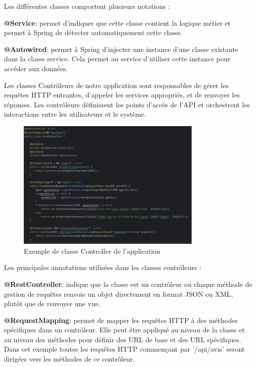         Les différentes classes comportent plusieurs notations :
        \medskip

        \textbf{@Service}: permet d'indiquer que cette classe contient la logique métier et permet à Spring de détecter automatiquement cette classe.
        \medskip

        \textbf{@Autowired}: permet à Spring d'injecter une instance d'une classe existante dans la classe service. Cela permet au service d'utiliser cette instance pour accéder aux données.
        \vspace{1cm}

        Les classes Contrôleurs de notre application sont responsables de gérer les requêtes HTTP entrantes, d'appeler les services appropriés, et de renvoyer les réponses. Les contrôleurs définissent les points d'accès de l'API et orchestrent les interactions entre les utilisateurs et le système.
        \medskip

        \begin{figure}[h!]
            \centering
            \includegraphics[width=0.8\textwidth]{images/code/controlleurAvis.PNG}
            \caption{Exemple de classe Controller de l'application}
        \end{figure}
        \medskip

        Les principales annotations utilisées dans les classes contrôleurs :
        \medskip

        \textbf{@RestController}: indique que la classe est un contrôleur ou chaque méthode de gestion de requêtes renvoie un objet directement en format JSON ou XML, plutôt que de renvoyer une vue.
        \medskip

        \textbf{@RequestMapping}: permet de mapper les requêtes HTTP à des méthodes spécifiques dans un contrôleur. Elle peut être appliqué au niveau de la classe et au niveau des méthodes pour définir des URL de base et des URL spécifiques.\\
        Dans cet exemple toutes les requêtes HTTP commençant par '/api/avis' seront dirigées vers les méthodes de ce contrôleur.
        \medskip

